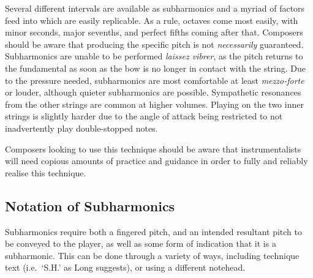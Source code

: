Several different intervals are available as subharmonics and a myriad of factors feed into which are easily replicable. As a rule, octaves come most easily, with minor seconds, major sevenths, and perfect fifths coming after that.\autocite[]{kimuraHowProduceSubharmonics1999}
Composers should be aware that producing the specific pitch is not \emph{necessarily} guaranteed.
Subharmonics are unable to be performed \emph{laissez vibrer}, as the pitch returns to the fundamental as soon as the bow is no longer in contact with the string.\autocite[]{appleseedFeedbackExploratorySession2019}
Due to the pressure needed, subharmonics are most comfortable at least \emph{mezzo-forte} or louder, although quieter subharmonics are possible. 
Sympathetic resonances from the other strings are common at higher volumes.
Playing on the two inner strings is slightly harder due to the angle of attack being restricted to not inadvertently play double-stopped notes.\autocite[99]{welbanksFoundationsModernCello}



Composers looking to use this technique should be aware that instrumentalists will need copious amounts of practice and guidance in order to fully and reliably realise this technique.

\subsection{Notation of Subharmonics}\label{sec:notation-subharmonics}
Subharmonics require both a fingered pitch, and an intended resultant pitch to be conveyed to the player, as well as some form of indication that it is a subharmonic.
This can be done through a variety of ways, including technique text (i.e.\ `S.H.' as Long suggests), or using a different notehead.\autocite[]{longSubharmonics2019}

